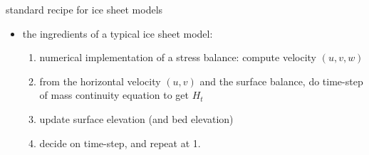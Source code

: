 \begin{frame}{standard recipe for ice sheet models}

\begin{itemize}
\item the ingredients of a typical ice sheet model:
  \begin{enumerate}
  \item numerical implementation of a stress balance: compute velocity $(u,v,w)$
  \item from the horizontal velocity $(u,v)$ and the surface balance, do time-step of mass continuity equation to get $H_t$
  \item update surface elevation (and bed elevation)
  \item decide on time-step, and repeat at 1.
  \end{enumerate}
\end{itemize}
\end{frame}
